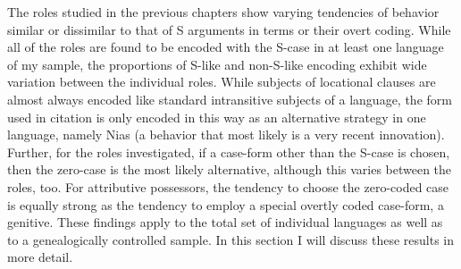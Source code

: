 The roles studied in the previous chapters show varying tendencies of behavior similar or dissimilar to that of S arguments in terms or their overt coding.
While all of the roles are found to be encoded with the S-case in at least one language of my sample, the proportions of S-like and non-S-like encoding exhibit wide variation between the individual roles. 
While subjects of locational clauses are almost always encoded like standard intransitive subjects of a language, the form used in citation is only encoded in this way as an alternative strategy in one language, namely Nias (a behavior that most likely is a very recent innovation).  
Further, for the roles investigated, if a case-form other than the S-case is chosen, then the zero-case is the most likely alternative, although this varies between the roles, too. 
For attributive possessors, the tendency to choose the zero-coded case is equally strong as the tendency to employ a special overtly coded case-form, a genitive. 
These findings apply to the total set of individual languages as well as to a genealogically controlled sample.
In this section I will discuss these results in more detail. 

 
